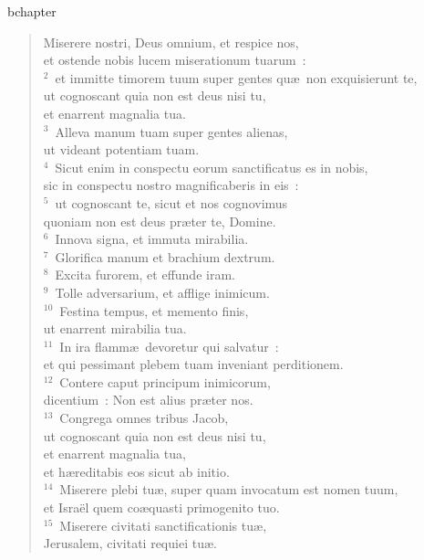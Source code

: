 bchapter\begin{verse}\vspace{-19pt}Miserere nostri, Deus omnium, et respice nos,\\ et ostende nobis lucem miserationum tuarum~:\\
${}^{2}$~et immitte timorem tuum super gentes qu\ae\ non exquisierunt te,\\ ut cognoscant quia non est deus nisi tu,\\ et enarrent magnalia tua.\\
${}^{3}$~Alleva manum tuam super gentes alienas,\\ ut videant potentiam tuam.\\
${}^{4}$~Sicut enim in conspectu eorum sanctificatus es in nobis,\\ sic in conspectu nostro magnificaberis in eis~:\\
${}^{5}$~ut cognoscant te, sicut et nos cognovimus\\ quoniam non est deus pr\ae ter te, Domine.\\
${}^{6}$~Innova signa, et immuta mirabilia.\\
${}^{7}$~Glorifica manum et brachium dextrum.\\
${}^{8}$~Excita furorem, et effunde iram.\\
${}^{9}$~Tolle adversarium, et afflige inimicum.\\
${}^{10}$~Festina tempus, et memento finis,\\ ut enarrent mirabilia tua.\\
${}^{11}$~In ira flamm\ae\ devoretur qui salvatur~:\\ et qui pessimant plebem tuam inveniant perditionem.\\
${}^{12}$~Contere caput principum inimicorum,\\ dicentium~: Non est alius pr\ae ter nos.\\
${}^{13}$~Congrega omnes tribus Jacob,\\ ut cognoscant quia non est deus nisi tu,\\ et enarrent magnalia tua,\\ et h\ae reditabis eos sicut ab initio.\\
${}^{14}$~Miserere plebi tu\ae , super quam invocatum est nomen tuum,\\ et Isra\"el quem co\ae quasti primogenito tuo.\\
${}^{15}$~Miserere civitati sanctificationis tu\ae ,\\ Jerusalem, civitati requiei tu\ae .\\

\end{verse}
